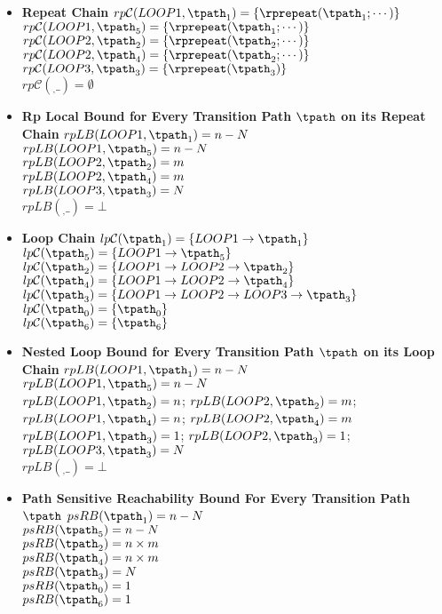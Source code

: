 \begin{itemize}
    \item \textbf{Repeat Chain}
    $rp\mathcal{C}(LOOP1, \tpath_1) = \{\rprepeat(\tpath_1; \cdots)\}$ \\
    $rp\mathcal{C}(LOOP1, \tpath_5) = \{\rprepeat(\tpath_1; \cdots)\}$ \\
    $rp\mathcal{C}(LOOP2, \tpath_2) = \{\rprepeat(\tpath_2; \cdots)\}$ \\
    $rp\mathcal{C}(LOOP2, \tpath_4) = \{\rprepeat(\tpath_2; \cdots)\}$ \\
    $rp\mathcal{C}(LOOP3, \tpath_3) = \{\rprepeat(\tpath_3)\}$ \\
    $rp\mathcal{C}(_, \_) = \emptyset$ 
    \item \textbf{Rp Local Bound for Every Transition Path $\tpath$ on its Repeat Chain}
    $rpLB(LOOP1, \tpath_1) = n - N$ \\
    $rpLB(LOOP1, \tpath_5) = n - N$ \\
    $rpLB(LOOP2, \tpath_2) = m$ \\
    $rpLB(LOOP2, \tpath_4) = m$ \\
    $rpLB(LOOP3, \tpath_3) = N$ \\
    $rpLB(_, \_) = \bot $ 
    \item \textbf{Loop Chain}
    $lp\mathcal{C}(\tpath_1) = \{LOOP1\to \tpath_1\}$ \\
    $lp\mathcal{C}(\tpath_5) = \{LOOP1\to \tpath_5\}$ \\
    $lp\mathcal{C}(\tpath_2) = \{LOOP1 \to LOOP2 \to \tpath_2\}$ \\
    $lp\mathcal{C}(\tpath_4) = \{LOOP1 \to LOOP2 \to \tpath_4\}$ \\
    $lp\mathcal{C}(\tpath_3) = \{LOOP1 \to LOOP2 \to LOOP3 \to \tpath_3\}$ \\
    $lp\mathcal{C}(\tpath_0) = \{\tpath_0\}$ \\
    $lp\mathcal{C}(\tpath_6) = \{\tpath_6\}$ 
    \item \textbf{Nested Loop Bound for Every Transition Path $\tpath$ on its Loop Chain}
    $rpLB(LOOP1, \tpath_1) = n - N$ \\
    $rpLB(LOOP1, \tpath_5) = n - N$ \\
    $rpLB(LOOP1, \tpath_2) = n$;  $rpLB(LOOP2, \tpath_2) = m$; \\
    $rpLB(LOOP1, \tpath_4) = n$; $rpLB(LOOP2, \tpath_4) = m$ \\
    $rpLB(LOOP1, \tpath_3) = 1$; $rpLB(LOOP2, \tpath_3) = 1$; $rpLB(LOOP3, \tpath_3) = N$ \\
    $rpLB(_, \_) = \bot $ 
    \item \textbf{Path Sensitive Reachability Bound For Every Transition Path $\tpath$ }
    $psRB(\tpath_1) = n - N$ \\
    $psRB(\tpath_5) = n - N$ \\
    $psRB(\tpath_2) = n \times m$ \\
    $psRB(\tpath_4) = n \times m$ \\
    $psRB(\tpath_3) = N$ \\
    $psRB(\tpath_0) = 1$ \\
    $psRB(\tpath_6) = 1$ 
\end{itemize}
